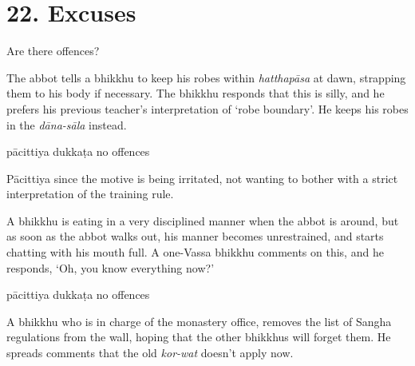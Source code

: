 \chapter{22. Excuses}
\renewcommand*{\theChapterTitle}{22. Excuses}

\begin{exam}{\autoExamName}

  \begin{problem*}

    Are there offences?

    \begin{parts}

      \item The abbot tells a bhikkhu to keep his robes within \emph{hatthapāsa}
      at dawn, strapping them to his body if necessary. The bhikkhu responds
      that this is silly, and he prefers his previous teacher's interpretation
      of `robe boundary'. He keeps his robes in the \emph{dāna-sāla} instead.

      \bigskip

      \begin{answers}{3}
        \bChoices
         pācittiya\eAns
         dukkaṭa\eAns
         no offences\eAns
        \eChoices
      \end{answers}

      \begin{solution}
        Pācittiya since the motive is being irritated, not wanting to bother
        with a strict interpretation of the training rule.
      \end{solution}

      \bigskip

      \item A bhikkhu is eating in a very disciplined manner when the abbot is
      around, but as soon as the abbot walks out, his manner becomes
      unrestrained, and starts chatting with his mouth full. A one-Vassa bhikkhu
      comments on this, and he responds, `Oh, you know everything now?'

      \bigskip

      \begin{answers}{3}
        \bChoices
         pācittiya\eAns
         dukkaṭa\eAns
         no offences\eAns
        \eChoices
      \end{answers}

      \bigskip

      \item A bhikkhu who is in charge of the monastery office, removes the list
      of Sangha regulations from the wall, hoping that the other bhikkhus will
      forget them. He spreads comments that the old \emph{kor-wat} doesn't apply now.


\end{parts}
\end{problem*}
\end{exam}
